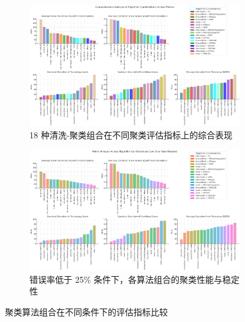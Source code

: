\documentclass[10pt]{article} %
\numberwithin{equation}{section}
\begin{document}
\begin{figure}[htbp]
    \centering
    \setlength{\abovecaptionskip}{5pt}  %
    \setlength{\belowcaptionskip}{5pt}  %

    \begin{subfigure}{0.9\linewidth}  %
        \centering
        \includegraphics[width=\linewidth]{alg_comb_metrics.png}
        \caption{18 种清洗-聚类组合在不同聚类评估指标上的综合表现}
        \label{fig:alg_comb_metrics}
    \end{subfigure}

    \vspace{1em}  %

    \begin{subfigure}{0.9\linewidth}  %
        \centering
        \includegraphics[width=\linewidth]{alg_comb_metrics_low.png}
        \caption{错误率低于 25\% 条件下，各算法组合的聚类性能与稳定性}
        \label{fig:alg_comb_metrics_low}
    \end{subfigure}

    \caption{聚类算法组合在不同条件下的评估指标比较}
    \label{fig:alg_comb_metrics_comparison}
\end{figure}
\end{document}
